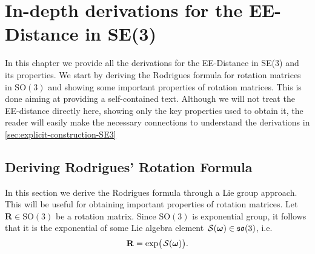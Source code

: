 \chapter{In-depth derivations for the EE-Distance in SE(3)}\label{app:rodrigues-formula}
In this chapter we provide all the derivations for the EE-Distance in SE(3) and its properties. We start by deriving the Rodrigues formula for rotation matrices in $\text{SO}(3)$ and showing some important properties of rotation matrices. This is done aiming at providing a self-contained text. Although we will not treat the EE-distance directly here, showing only the key properties used to obtain it, the reader will easily make the necessary connections to understand the derivations in \cref{sec:explicit-construction-SE3}

\section{Deriving Rodrigues' Rotation Formula}
In this section we derive the Rodrigues formula through a Lie group approach. This will be useful for obtaining important properties of rotation matrices. Let $\mathbf{R}\in\text{SO}(3)$ be a rotation matrix. Since $\text{SO}(3)$ is exponential group, it follows that it is the exponential of some Lie algebra element $\SL[\boldsymbol{\omega}]\in\mathfrak{so}(3)$, i.e.
\begin{align}
    \mathbf{R} = \exp\bigl(\SL[\boldsymbol{\omega}]\bigr).
\end{align}

